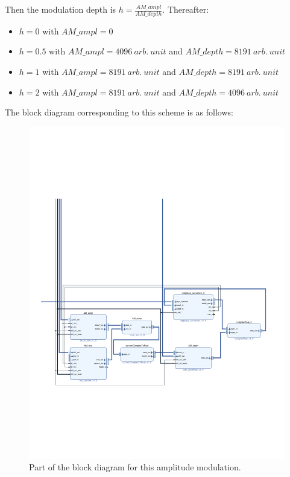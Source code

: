 \documentclass[12pt,oneside]{article}
\begin{document}
Then the modulation depth is $h=\frac{AM\_ampl}{AM\_depth}$. Thereafter:
\vspace{-0.1cm}
\begin{itemize}
	\setlength\itemsep{-0.2cm}
	\item $h=0$ with $AM\_ampl=0$ 
	\item $h=0.5$ with $AM\_ampl=4096~arb.~unit$ and $AM\_depth=8191~arb.~unit$
	\item $h=1$ with $AM\_ampl=8191~arb.~unit$ and $AM\_depth=8191~arb.~unit$
	\item $h=2$ with $AM\_ampl=8191~arb.~unit$ and $AM\_depth=4096~arb.~unit$
\end{itemize}The block diagram corresponding to this scheme is as follows:\newpage

\begin{figure}[h!tb]
	\begin{center}
		\includegraphics[width=14cm,trim={1.8cm 6cm 1cm 13cm}, clip]{design/mod_ampl1.pdf}
		\caption{Part of the block diagram for this amplitude modulation.}
		\label{fig:mod_ampl1}
	\end{center}
\end{figure}
\end{document}
